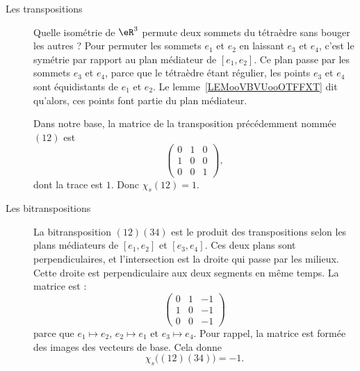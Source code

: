 \begin{description}
	\item[Les transpositions]

	      Quelle isométrie de $\eR^3$ permute deux sommets du tétraèdre sans bouger les autres ? Pour permuter les sommets \( e_1\) et \( e_2\) en laissant \( e_3\) et \( e_4\), c'est le symétrie par rapport au plan médiateur de \( [e_1,e_2]\). Ce plan passe par les sommets \( e_3\) et \( e_4\), parce que le tétraèdre étant régulier, les points \( e_3\) et \( e_4\) sont équidistants de \( e_1\) et \( e_2\). Le lemme~\ref{LEMooVBVUooOTFFXT} dit qu'alors, ces points font partie du plan médiateur.

	      Dans notre base, la matrice de la transposition précédemment nommée \( (12)\) est
	      \begin{equation}
		      \begin{pmatrix}
			      0 & 1 & 0 \\
			      1 & 0 & 0 \\
			      0 & 0 & 1
		      \end{pmatrix},
	      \end{equation}
	      dont la trace est \( 1\). Donc \( \chi_s(12)=1\).

	\item[Les bitranspositions]

	      La bitransposition \( (12)(34)\) est le produit des transpositions selon les plans médiateurs de \( [e_1,e_2]\) et \( [e_3,e_4]\). Ces deux plans sont perpendiculaires, et l'intersection est la droite qui passe par les milieux. Cette droite est perpendiculaire aux deux segments en même temps. La matrice est :
	      \begin{equation}
		      \begin{pmatrix}
			      0 & 1 & -1 \\
			      1 & 0 & -1 \\
			      0 & 0 & -1
		      \end{pmatrix}
	      \end{equation}
	      parce que \( e_1\mapsto e_2\), \( e_2\mapsto e_1\) et \( e_3\mapsto e_4\). Pour rappel, la matrice est formée des images des vecteurs de base. Cela donne
	      \begin{equation}
		      \chi_s\big( (12)(34) \big)=-1.
	      \end{equation}


\end{description}
